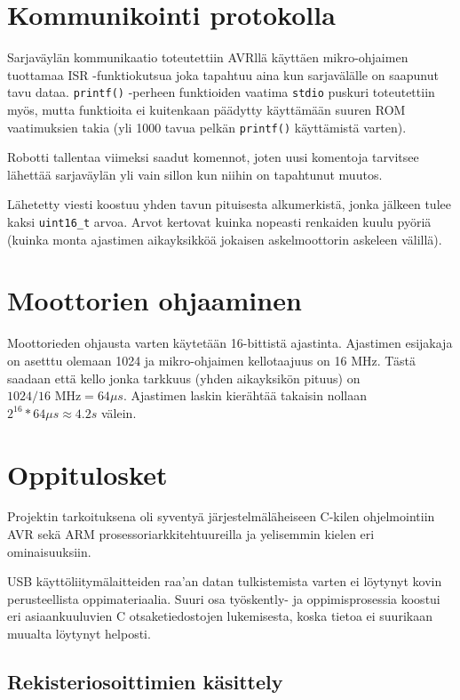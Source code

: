 \documentclass[]{article} %
\numberwithin{equation}{section}
\numberwithin{figure}{section}
\numberwithin{table}{section}
\begin{document}
\section{Kommunikointi protokolla}
\label{sec:Kommunikointi protokilla}

Sarjaväylän kommunikaatio toteutettiin AVRllä käyttäen mikro-ohjaimen tuottamaa ISR -funktiokutsua joka tapahtuu aina kun sarjavälälle on saapunut tavu dataa. \verb+printf()+ -perheen funktioiden vaatima \verb+stdio+ puskuri toteutettiin myös, mutta funktioita ei kuitenkaan päädytty käyttämään suuren ROM vaatimuksien takia (yli 1000 tavua pelkän \verb+printf()+ käyttämistä varten). 

Robotti tallentaa viimeksi saadut komennot, joten uusi komentoja tarvitsee lähettää sarjaväylän yli vain sillon kun niihin on tapahtunut muutos.

Lähetetty viesti koostuu yhden tavun pituisesta alkumerkistä, jonka jälkeen tulee kaksi \verb+uint16_t+ arvoa. Arvot kertovat kuinka nopeasti renkaiden kuulu pyöriä (kuinka monta ajastimen aikayksikköä jokaisen askelmoottorin askeleen välillä). 

\section{Moottorien ohjaaminen}
\label{sec:Moottorien ohjaaminen}


Moottorieden ohjausta varten käytetään 16-bittistä ajastinta. Ajastimen esijakaja on asetttu olemaan 1024 ja mikro-ohjaimen kellotaajuus on 16 MHz. Tästä saadaan että kello jonka tarkkuus (yhden aikayksikön pituus) on $1024/16 \text{ MHz} = 64 \mu s $. Ajastimen laskin kierähtää takaisin nollaan $2^{16} * 64\mu s \approx 4.2 s$ välein. 


\section{Oppitulosket}
\label{sec:Oppitulosket}

Projektin tarkoituksena oli syventyä järjestelmäläheiseen C-kilen ohjelmointiin AVR sekä ARM prosessoriarkkitehtuureilla ja yelisemmin kielen eri ominaisuuksiin.

USB käyttöliitymälaitteiden raa'an datan tulkistemista varten ei löytynyt kovin perusteellista oppimateriaalia.
Suuri osa työskently- ja oppimisprosessia koostui eri asiaankuuluvien C otsaketiedostojen lukemisesta, koska tietoa ei suurikaan muualta löytynyt helposti. 

\subsection{Rekisteriosoittimien käsittely}
\label{Rekisteriosoittimien kasittely}
\end{document}

